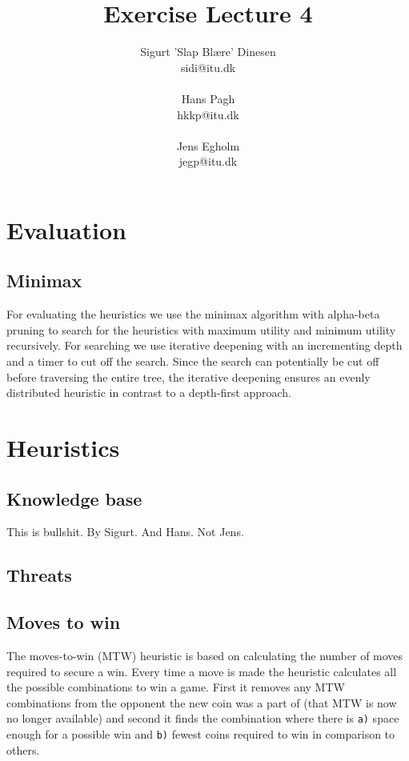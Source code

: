 \documentclass[a4paper, titlepage]{article}
\begin{document}
\title{Exercise Lecture 4}
\author{Sigurt 'Slap Blære' Dinesen \\sidi@itu.dk \\\\ Hans Pagh \\hkkp@itu.dk 
\\\\Jens Egholm \\jegp@itu.dk}
\maketitle
\pagebreak

\section*{Evaluation}
\subsection*{Minimax}
For evaluating the heuristics we use the minimax algorithm with alpha-beta pruning to
search for the heuristics with maximum utility and minimum utility recursively. 
For searching we use iterative deepening with an incrementing depth and a timer to cut off
the search. Since the search can potentially be cut off before traversing the entire tree, 
the iterative deepening ensures an evenly distributed heuristic in contrast to a depth-first
approach.

\section*{Heuristics}
\subsection*{Knowledge base}
This is bullshit. By Sigurt. And Hans. Not Jens.

\subsection*{Threats}


\subsection*{Moves to win}
The moves-to-win (MTW) heuristic is based on calculating the number of moves required to 
secure a win. Every time a move is made the heuristic calculates all the possible 
combinations to win a game. First it removes any MTW combinations from the opponent
the new coin was a part of (that MTW is now no longer available) and second it finds 
the combination where there is \texttt{a)} space enough for a possible win and 
\texttt{b)} fewest coins required to win in comparison to others.
\end{document}
